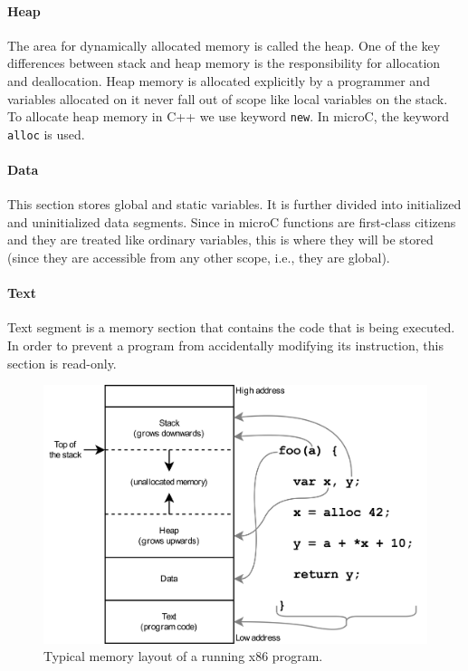 \documentclass[thesis=M,english]{FITthesis}[2019/12/23]
\begin{document}
\paragraph*{Heap} The area for dynamically allocated memory is called the heap. One of the key differences between stack and heap memory is the responsibility for allocation and deallocation. Heap memory is allocated explicitly by a programmer and variables allocated on it never fall out of scope like local variables on the stack. To allocate heap memory in C++ we use keyword \texttt{new}. In microC, the keyword \texttt{alloc} is used.

\paragraph*{Data} This section stores global and static variables. It is further divided into initialized and uninitialized data segments. Since in microC functions are first-class citizens and they are treated like ordinary variables, this is where they will be stored (since they are accessible from any other scope, i.e., they are global).

\paragraph*{Text} Text segment is a memory section that contains the code that is being executed. In order to prevent a program from accidentally modifying its instruction, this section is read-only.
\begin{figure}
    \centering
    \includegraphics[width=12cm]{img/x86memory}
    \caption{Typical memory layout of a running x86 program.}\label{fig:x86_memory}
\end{figure}
\end{document}
